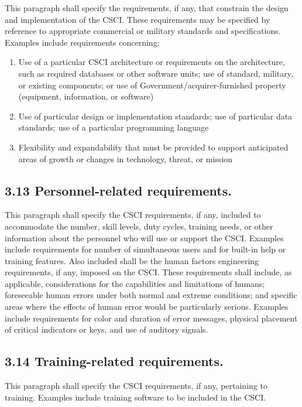This paragraph shall specify the requirements, if any, that constrain
the design and implementation of the CSCI. These requirements may be
specified by reference to appropriate commercial or military standards
and specifications. Examples include requirements concerning:

\begin{enumerate}
\itemsep1pt\parskip0pt
\item
  Use of a particular CSCI architecture or requirements on the
  architecture, such as required databases or other software units; use
  of standard, military, or existing components; or use of
  Government/acquirer-furnished property (equipment, information, or
  software)
\item
  Use of particular design or implementation standards; use of
  particular data standards; use of a particular programming language
\item
  Flexibility and expandability that must be provided to support
  anticipated areas of growth or changes in technology, threat, or
  mission
\end{enumerate}

\subsection{3.13 Personnel-related requirements.}

This paragraph shall specify the CSCI requirements, if any, included to
accommodate the number, skill levels, duty cycles, training needs, or
other information about the personnel who will use or support the CSCI.
Examples include requirements for number of simultaneous users and for
built-in help or training features. Also included shall be the human
factors engineering requirements, if any, imposed on the CSCI. These
requirements shall include, as applicable, considerations for the
capabilities and limitations of humans; foreseeable human errors under
both normal and extreme conditions; and specific areas where the effects
of human error would be particularly serious. Examples include
requirements for color and duration of error messages, physical
placement of critical indicators or keys, and use of auditory signals.

\subsection{3.14 Training-related requirements.}

This paragraph shall specify the CSCI requirements, if any, pertaining
to training. Examples include training software to be included in the
CSCI.

